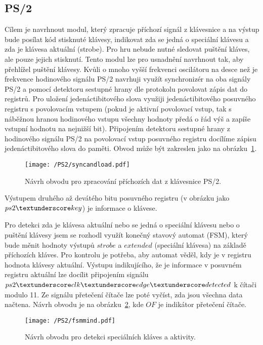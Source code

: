\documentclass{report}
\begin{document}
\subsection{PS/2}\label{sec:ps2sub}
Cílem je navrhnout modul, který zpracuje příchozí signál z klávesnice a na výstup bude posílat kód stisknuté klávesy, indikovat zda se jedná o speciální klávesu a zda je klávesa aktuální (strobe). Pro hru nebude nutné sledovat puštění kláves, ale pouze jejich stisknutí. Tento modul lze pro usnadnění navrhnout tak, aby přehlížel puštění klávesy. Kvůli o mnoho vyšší frekvenci oscilátoru na desce než je frekvence hodinového signálu PS/2 navrhuji využít synchronizér na oba signály PS/2 a pomocí detektoru sestupné hrany dle protokolu povolovat zápis dat do registrů. Pro uložení jedenáctibitového slova využiji jedenáctibitového posuvného registru s povolovacím vstupem (pokud je aktivní povolovací vstup, tak s náběžnou hranou hodinového vstupu všechny hodnoty předá o řád výš a zapíše vstupní hodnotu na nejnižší bit). Připojením detektoru sestupné hrany z hodinového signálu PS/2 na povolovací vstup posuvného registru docílíme zápisu jedenáctibitového slova do paměti. Obvod může být zakreslen jako na obrázku~\ref{fig:syncandload}.
\begin{figure}
\centering
\texttt{[image: /PS2/syncandload.pdf]}
\caption{Návrh obvodu pro zpracování příchozích dat z klávesnice PS/2.}
\label{fig:syncandload}
\end{figure}
Výstupem druhého až devátého bitu posuvného registru (v obrázku jako $ps2\textunderscore key$) je informace o klávese. \par Pro detekci zda je klávesa aktuální nebo se jedná o speciální klávesu nebo o puštění klávesy jsem se rozhodl využít konečný stavový automat (FSM), který bude měnit hodnoty výstupů $strobe$ a $extended$ (speciální klávesa) na základě příchozích kláves. Pro kontrolu je potřeba, aby automat věděl, kdy je v registru hodnota klávesy aktuální. Výstupu indikujícího, že je informace v posuvném registru aktuální lze docílit připojením signálu $ps2\textunderscore clk\textunderscore edge\textunderscore detected$ k čítači modulo 11. Ze signálu přetečení čítače lze poté vyčíst, zda jsou všechna data načtena. Návrh obvodu je na obrázku~\ref{fig:fsmmind}, kde $OF$ je indikátor přetečení čítače.
\begin{figure}
\centering
\texttt{[image: /PS2/fsmmind.pdf]}
\caption{Návrh obvodu pro detekci speciálních kláves a aktivity.}
\label{fig:fsmmind}
\end{figure}
\end{document}
